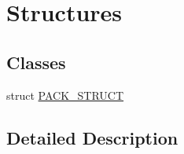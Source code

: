 \hypertarget{group___structures}{\section{Structures}
\label{group___structures}
}
\subsection*{Classes}
\begin{DoxyCompactItemize}
\item 
struct \hyperlink{struct_p_a_c_k___s_t_r_u_c_t}{P\-A\-C\-K\-\_\-\-S\-T\-R\-U\-C\-T}
\end{DoxyCompactItemize}


\subsection{Detailed Description}
